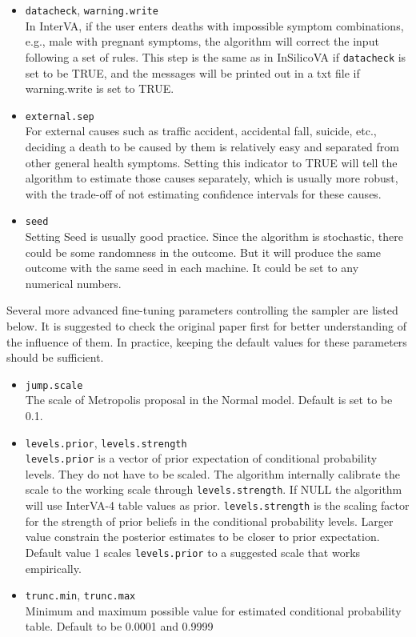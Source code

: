 \documentclass{article}\usepackage[]{graphicx}\usepackage[]{color}
\makeatletter
\newcommand\code{\bgroup\@makeother\_\@makeother\~\@makeother\$\@codex}
\def\@codex#1{{\normalfont\ttfamily\hyphenchar\font=-1 #1}\egroup}
\let\code=\texttt
\makeatother
\begin{document}
\begin{itemize}
  	\item{\code{datacheck}, \code{warning.write}}\\ In InterVA, if the user enters deaths with impossible symptom combinations, e.g., male with pregnant symptoms, the algorithm will correct the input following a set of rules. This step is the same as in InSilicoVA if \code{datacheck} is set to be TRUE, and the messages will be printed out in a txt file if warning.write is set to TRUE. 

  	\item{\code{external.sep}}\\ For external causes such as traffic accident, accidental fall, suicide, etc., deciding a death to be caused by them is relatively easy and separated from other general health symptoms. Setting this indicator to TRUE will tell the algorithm to estimate those causes separately, which is usually more robust, with the trade-off of not estimating confidence intervals for these causes. 

  	\item{\code{seed}}\\ Setting Seed is usually good practice. Since the algorithm is stochastic, there could be some randomness in the outcome. But it will produce the same outcome with the same seed in each machine. It could be set to any numerical numbers.

\end{itemize}

Several more advanced fine-tuning parameters controlling the sampler are listed below. It is suggested to check the original paper first for better understanding of the influence of them. In practice, keeping the default values for these parameters should be sufficient.

\begin{itemize}
	\item{\code{jump.scale}}\\ The scale of Metropolis proposal in the Normal model. Default is set to be 0.1.
	
	\item{\code{levels.prior}, \code{levels.strength}}\\ 
	    \code{levels.prior} is a vector of prior expectation of conditional probability levels. They do not have to be scaled. The algorithm internally calibrate the scale to the working scale through \code{levels.strength}. If NULL the algorithm will use InterVA-4 table values as prior. \code{levels.strength} is the scaling factor for the strength of prior beliefs in the conditional probability levels. Larger value constrain the posterior estimates to be closer to prior expectation. Default value 1 scales \code{levels.prior} to a suggested scale that works empirically.  
 	
 	\item{\code{trunc.min}, \code{trunc.max}}\\ Minimum and maximum possible value for estimated conditional probability table. Default to be 0.0001 and 0.9999	  

\end{itemize}
\end{document}
